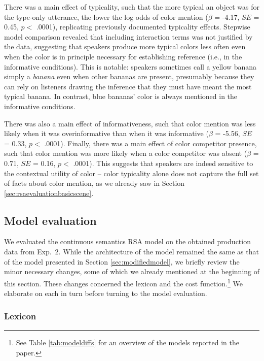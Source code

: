 \documentclass[11pt]{article}
\newcommand{\tableref}[1]{Table \ref{#1}}
\newcommand{\sectionref}[1]{Section \ref{#1}}
\begin{document}
There was a main effect of typicality, such that the more typical an object was for the type-only utterance, the lower the log odds of color mention ($\beta$ = -4.17, $SE$ = 0.45, $p <$ .0001), replicating previously documented typicality effects. Stepwise model comparison revealed that including interaction terms was not justified by the data, suggesting that speakers produce more typical colors less often even when the color is in principle necessary for establishing reference (i.e., in the informative conditions). This is notable: speakers sometimes call a yellow banana simply a \emph{banana} even when other bananas are present, presumably because they can rely on listeners drawing the inference that they must have meant the most typical banana. In contrast, blue bananas' color is always mentioned in the informative conditions.

There was also a main effect of informativeness, such that color mention was less likely when it was overinformative than when it was informative ($\beta$ = -5.56, $SE$ = 0.33, $p <$ .0001). Finally, there was a main effect of color competitor presence, such that color mention was more likely when a color competitor was absent  ($\beta$ = 0.71, $SE$ = 0.16, $p <$ .0001). This suggests that speakers are indeed sensitive to the contextual utility of color -- color typicality alone does not capture the full set of facts about color mention, as we already saw in \sectionref{sec:rsaevaluationbasicscene}.


\subsection{Model evaluation}
\label{sec:colorypicalitymodel}


We evaluated the continuous semantics RSA model on the obtained production data from Exp.~2. While the architecture of the model remained the same as that of the model presented in \sectionref{sec:modifiedmodel}, we briefly review the minor necessary changes, some of which we already mentioned at the beginning of this section. These changes concerned the lexicon and the cost function.\footnote{See \tableref{tab:modeldiffs} for an overview of the models reported in the paper.} We elaborate on each in turn before turning to the model evaluation. 

\subsubsection{Lexicon}
\end{document}
